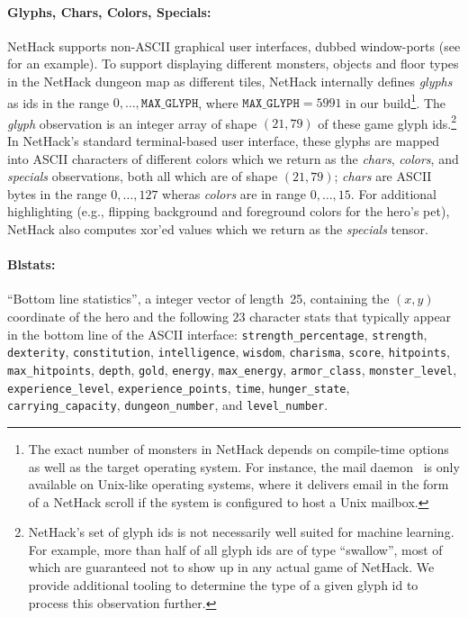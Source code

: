 \documentclass{article}
\newcommand{\MailDaemon}{{\bf\ttfamily\color{nethack_blue}\sethlcolor{black}\hl{\&}}}
\begin{document}
\paragraph{Glyphs, Chars, Colors, Specials:}  NetHack supports
non-ASCII graphical user interfaces, dubbed window-ports
(see  for an example). To support displaying
different monsters, objects and floor types in the NetHack dungeon map
as different tiles, NetHack internally defines \emph{glyphs} as ids in
the range $0, \ldots, \texttt{MAX\_GLYPH}$, where $\texttt{MAX\_GLYPH}
= 5991$ in our build\footnote{The exact number of monsters in NetHack
depends on compile-time options as well as the target operating
system. For instance, the mail daemon \protect\MailDaemon\ is only available
on Unix-like operating systems, where it delivers
email in the form of a NetHack scroll if the system is configured to
host a Unix mailbox.}. The \textit{glyph} observation is an integer
array of shape $(21, 79)$ of these game glyph ids.\footnote{NetHack's
  set of glyph ids is not necessarily well suited for machine
  learning. For example, more than half of all glyph ids are of type
  ``swallow'', most of which are guaranteed not to show up in any
  actual game of NetHack. We provide additional tooling to determine
  the type of a given glyph id to process this observation further.}
In NetHack's standard terminal-based user interface, these glyphs are
mapped into ASCII characters of different colors which we return as
the \textit{chars}, \textit{colors}, and \textit{specials}
observations, both all which are
of shape $(21, 79)$; \textit{chars} are ASCII bytes in the range $0,\ldots,127$
wheras \textit{colors} are in range $0,\ldots,15$. For additional
highlighting (e.g., flipping background and foreground colors for the
hero's pet),
NetHack also computes xor'ed values which we return as
the \textit{specials} tensor.

\paragraph{Blstats:} ``Bottom line statistics'', a integer vector of
length~25, containing
the $(x, y)$ coordinate of the hero and the following $23$ character
stats that typically appear in the bottom line of the ASCII
interface: \texttt{strength\_percentage}, \texttt{strength},
\texttt{dexterity}, \texttt{constitution}, \texttt{intelligence},
\texttt{wisdom}, \texttt{charisma}, \texttt{score},
\texttt{hitpoints}, \texttt{max\_hitpoints},
\texttt{depth},
\texttt{gold},
\texttt{energy}, \texttt{max\_energy}, \texttt{armor\_class},
\texttt{monster\_level}, \texttt{experience\_level},
\texttt{experience\_points}, \texttt{time}, \texttt{hunger\_state},
\texttt{carrying\_capacity}, \texttt{dungeon\_number}, and \texttt{level\_number}.
\end{document}
